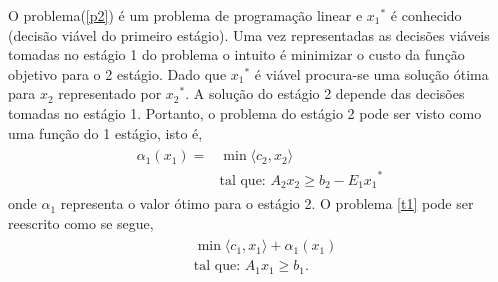 O problema(\ref {p2}) \'e um problema de programa\c c\~ao linear e ${x_1}^{*}$ \'e conhecido (decis\~ao vi\'avel do
primeiro est\'agio)\cite{alexey}. 
Uma vez representadas
as decis\~oes vi\'aveis tomadas no est\'agio 1 do
problema o intuito \'e minimizar o custo da fun\c c\~ao objetivo para o 2 est\'agio. Dado que ${x_1}^{*}$ \'e vi\'avel procura-se uma solu\c c\~ao \'otima para $x_2$ representado por
${x_2}^{*}$. A solu\c c\~ao do est\'agio 2 depende das decis\~oes tomadas no est\'agio 1. Portanto, o
problema do est\'agio 2 pode ser visto como uma fun\c c\~ao do 1 est\'agio\cite{cp}, isto \'e,
\begin{align}
  \begin{split}	
	\alpha_{1} (x_1) =& \min \langle c_2,x_2\rangle \\
	&\mbox{tal que: }A_2 x_2 \geq b_2 - {E_1 x_1}^{*} 
  \end{split}
    \label{p3}
\end{align}
onde ${\alpha}_{1}$ representa o valor \'otimo para o est\'agio 2.
O problema \ref{t1} pode ser reescrito como se segue,
\begin{align}
  \begin{split}	
  &\min \langle c_1,x_1\rangle + {\alpha}_{1}(x_1) \\
&\mbox{tal que: }	A_1x_1 \geq b_1.
\end{split}
\label{linear2}
  \end{align}

